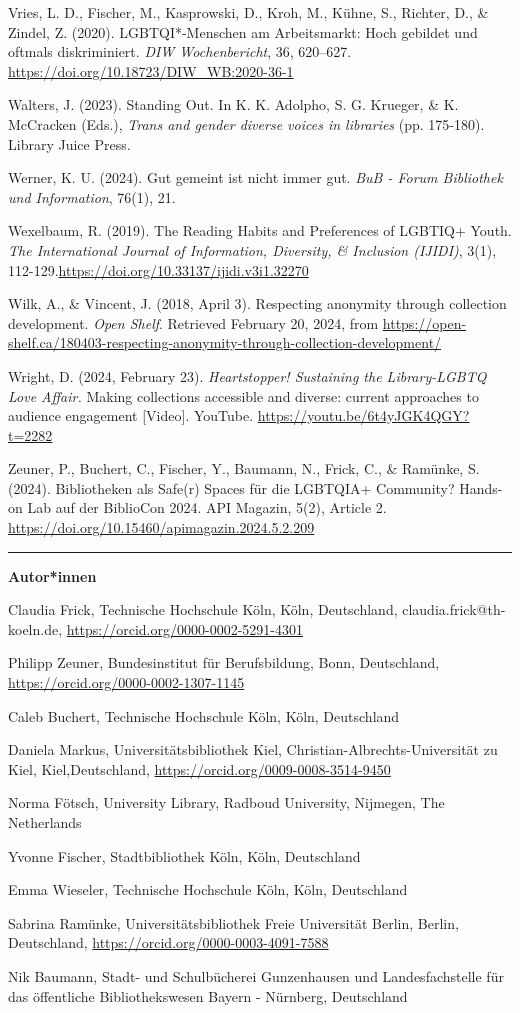 \documentclass[a4paper,
fontsize=11pt,
oneside,
numbers=noperiodatend,
parskip=half-,
bibliography=totoc,
final
]{scrartcl}
\begin{document}
Vries, L. D., Fischer, M., Kasprowski, D., Kroh, M., Kühne, S., Richter,
D., \& Zindel, Z. (2020). LGBTQI*-Menschen am Arbeitsmarkt: Hoch
gebildet und oftmals diskriminiert. \emph{DIW Wochenbericht}, 36,
620--627. \url{https://doi.org/10.18723/DIW_WB:2020-36-1}

Walters, J. (2023). Standing Out. In K. K. Adolpho, S. G. Krueger, \& K.
McCracken (Eds.), \emph{Trans and gender diverse voices in libraries}
(pp. 175-180). Library Juice Press.

Werner, K. U. (2024). Gut gemeint ist nicht immer gut. \emph{BuB - Forum
Bibliothek und Information}, 76(1), 21.

Wexelbaum, R. (2019). The Reading Habits and Preferences of LGBTIQ+
Youth. \emph{The International Journal of Information, Diversity, \&
Inclusion (IJIDI)}, 3(1),
112-129.\url{https://doi.org/10.33137/ijidi.v3i1.32270}

Wilk, A., \& Vincent, J. (2018, April 3). Respecting anonymity through
collection development. \emph{Open Shelf}. Retrieved February 20, 2024,
from
\url{https://open-shelf.ca/180403-respecting-anonymity-through-collection-development/}

Wright, D. (2024, February 23). \emph{Heartstopper! Sustaining the
Library-LGBTQ Love Affair.} Making collections accessible and diverse:
current approaches to audience engagement {[}Video{]}. YouTube.
\url{https://youtu.be/6t4yJGK4QGY?t=2282}

Zeuner, P., Buchert, C., Fischer, Y., Baumann, N., Frick, C., \&
Ramünke, S. (2024). Bibliotheken als Safe(r) Spaces für die LGBTQIA+
Community? Hands-on Lab auf der BiblioCon 2024. API Magazin, 5(2),
Article 2. \url{https://doi.org/10.15460/apimagazin.2024.5.2.209}

\begin{center}\rule{0.5\linewidth}{0.5pt}\end{center}

\textbf{Autor*innen}

Claudia Frick, Technische Hochschule Köln, Köln, Deutschland, claudia.frick@th-koeln.de, \url{https://orcid.org/0000-0002-5291-4301}

Philipp Zeuner, Bundesinstitut für Berufsbildung, Bonn, Deutschland, \url{https://orcid.org/0000-0002-1307-1145}

Caleb Buchert, Technische Hochschule Köln, Köln, Deutschland

Daniela Markus, Universitätsbibliothek Kiel, Christian-Albrechts-Universität zu Kiel, Kiel,\linebreak Deutschland, \url{https://orcid.org/0009-0008-3514-9450}

Norma Fötsch, University Library, Radboud University, Nijmegen, The Netherlands

Yvonne Fischer, Stadtbibliothek Köln, Köln, Deutschland

Emma Wieseler, Technische Hochschule Köln, Köln, Deutschland

Sabrina Ramünke, Universitätsbibliothek Freie Universität Berlin, Berlin, Deutschland, \url{https://orcid.org/0000-0003-4091-7588}

Nik Baumann, Stadt- und Schulbücherei Gunzenhausen und Landesfachstelle für das öffentliche Bibliothekswesen Bayern - Nürnberg, Deutschland
\end{document}
